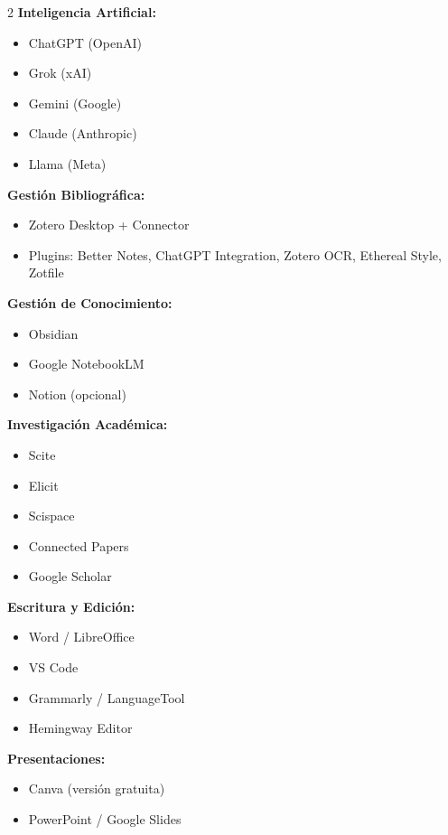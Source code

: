 \documentclass[12pt,a4paper]{yaac-luatex}
\begin{document}
	\begin{multicols}{2}
		\textbf{Inteligencia Artificial:}
		\begin{itemize}[leftmargin=*, itemsep=0.05cm]
			\item ChatGPT (OpenAI)
			\item Grok (xAI)
			\item Gemini (Google)
			\item Claude (Anthropic)
			\item Llama (Meta)
		\end{itemize}
		
		\textbf{Gestión Bibliográfica:}
		\begin{itemize}[leftmargin=*, itemsep=0.05cm]
			\item Zotero Desktop + Connector
			\item Plugins: Better Notes, ChatGPT Integration, Zotero OCR, Ethereal Style, Zotfile
		\end{itemize}
		
		\columnbreak
		
		\textbf{Gestión de Conocimiento:}
		\begin{itemize}[leftmargin=*, itemsep=0.05cm]
			\item Obsidian
			\item Google NotebookLM
			\item Notion (opcional)
		\end{itemize}
		
		\textbf{Investigación Académica:}
		\begin{itemize}[leftmargin=*, itemsep=0.05cm]
			\item Scite
			\item Elicit
			\item Scispace
			\item Connected Papers
			\item Google Scholar
		\end{itemize}
		
		\textbf{Escritura y Edición:}
		\begin{itemize}[leftmargin=*, itemsep=0.05cm]
			\item Word / LibreOffice
			\item VS Code
			\item Grammarly / LanguageTool
			\item Hemingway Editor
		\end{itemize}
		
		\textbf{Presentaciones:}
		\begin{itemize}[leftmargin=*, itemsep=0.05cm]
			\item Canva (versión gratuita)
			\item PowerPoint / Google Slides
		\end{itemize}
	\end{multicols}
	
\end{document}
